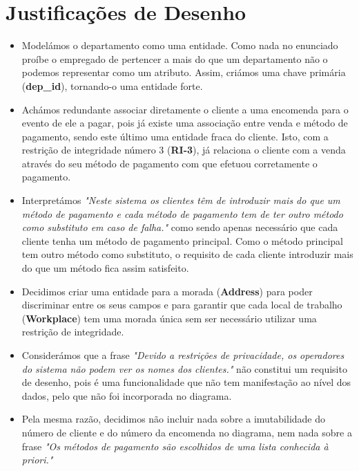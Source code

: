 \documentclass[12pt, a4paper]{article}
\begin{document}
  \section*{Justificações de Desenho}
  \normalsize
  \begin{itemize}
    \item Modelámos o departamento como uma entidade. Como nada no enunciado proíbe o empregado de pertencer a mais do que um departamento não o podemos
    representar como um atributo. Assim, criámos uma chave primária (\textbf{dep\_id}), tornando-o uma entidade forte.
    \item Achámos redundante associar diretamente o cliente a uma encomenda para o evento de ele a pagar, pois já existe uma associação entre
    venda e método de pagamento, sendo este último uma entidade fraca do cliente. Isto, com a restrição de integridade número 3 (\textbf{RI-3}),
    já relaciona o cliente com a venda através do seu método de pagamento com que efetuou corretamente o pagamento.
    \item Interpretámos \textit{"Neste sistema os clientes têm de introduzir mais do que um método de pagamento e cada método de pagamento
    tem de ter outro método como substituto em caso de falha."} como sendo apenas necessário que cada cliente tenha um método de pagamento principal.
    Como o método principal tem outro método como substituto, o requisito de cada cliente introduzir mais do que um método fica assim satisfeito.
    \item Decidimos criar uma entidade para a morada (\textbf{Address}) para poder discriminar entre os seus campos e para garantir
    que cada local de trabalho (\textbf{Workplace}) tem uma morada única sem ser necessário utilizar uma restrição de integridade.
    \item Considerámos que a frase \textit{"Devido a restrições de privacidade, os operadores do sistema não podem ver os nomes dos clientes."}
    não constitui um requisito de desenho, pois é uma funcionalidade que não tem manifestação ao nível dos dados, pelo que não foi incorporada no diagrama.
    \item Pela mesma razão, decidimos não incluir nada sobre a imutabilidade do número de cliente e do número da encomenda no diagrama, nem nada
    sobre a frase \textit{"Os métodos de pagamento são escolhidos de uma lista conhecida à priori."}
  \end{itemize}
\end{document}
